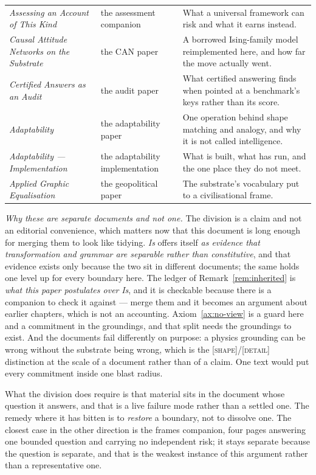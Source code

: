 \documentclass[11pt,a4paper]{article}
\theoremstyle{remark}\newtheorem{remark}[definition]{Remark}
\begin{document}
\begin{center}
\begin{tabular}{@{}>{\raggedright\arraybackslash}p{}>{\raggedright\arraybackslash}p{}>{\raggedright\arraybackslash}p{}@{}}
\emph{Assessing an Account of This Kind} & the assessment companion & What a universal framework can risk and what it earns instead.\\
\emph{Causal Attitude Networks on the Substrate} & the CAN paper & A borrowed Ising-family model reimplemented here, and how far the move actually went.\\
\emph{Certified Answers as an Audit} & the audit paper & What certified answering finds when pointed at a benchmark's keys rather than its score.\\
\emph{Adaptability} & the adaptability paper & One operation behind shape matching and analogy, and why it is not called intelligence.\\
\emph{Adaptability --- Implementation} & the adaptability implementation & What is built, what has run, and the one place they do not meet.\\
\emph{Applied Graphic Equalisation} & the geopolitical paper & The substrate's vocabulary put to a civilisational frame.\\
\bottomrule
\end{tabular}
\end{center}

\emph{Why these are separate documents and not one.} The division is a claim and not an editorial
convenience, which matters now that this document is long enough for merging them to look like tidying.
\emph{Is} offers itself \emph{as evidence that transformation and grammar are separable rather than
constitutive}, and that evidence exists only because the two sit in different documents; the same holds
one level up for every boundary here. The ledger of Remark~\ref{rem:inherited} is \emph{what this paper
postulates over} \emph{Is}, and it is checkable because there is a companion to check it against ---
merge them and it becomes an argument about earlier chapters, which is not an accounting. Axiom~\ref{ax:no-view} is
a guard here and a commitment in the groundings, and that split needs the groundings to exist. And the
documents fail differently on purpose: a physics grounding can be wrong without the substrate being
wrong, which is the \textsc{[shape]}/\textsc{[detail]} distinction at the scale of a document rather
than of a claim. One text would put every commitment inside one blast radius.

What the division does require is that material sits in the document whose question it answers, and
that is a live failure mode rather than a settled one. The remedy where it has bitten is to
\emph{restore} a boundary, not to dissolve one. The closest case in the other direction is the frames
companion, four pages answering one bounded question and carrying no independent risk; it stays separate
because the question is separate, and that is the weakest instance of this argument rather than a
representative one.
\end{document}
